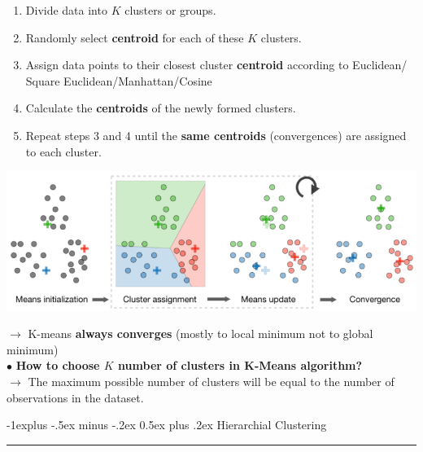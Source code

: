 \documentclass[letterpaper, 10.5pt,landscape]{article}
\makeatletter
\renewcommand{\subsection}{\@startsection{subsection}{2}{0mm}%
                                {-1explus -.5ex minus -.2ex}%
                                {0.5ex plus .2ex}%
                                {\normalfont\normalsize\bfseries}}
\makeatother
\begin{document}
\begin{multicols*}{3}
\begin{enumerate}
    \item Divide data into $K$ clusters or groups.
    \vspace{-3pt}
    \item Randomly select \textbf{centroid} for each of these $K$ clusters.
    \vspace{-3pt}
    \item Assign data points to their closest cluster
    \textbf{centroid} according to Euclidean/ Square Euclidean/Manhattan/Cosine
    \vspace{-3pt}
    \item Calculate the \textbf{centroids} of the newly formed clusters.
    \vspace{-3pt}
    \item Repeat steps 3 and 4 until the \textbf{same centroids} (convergences) are assigned to each cluster.
    \vspace{-3pt}
\end{enumerate}


\begin{center}
    \begin{minipage}{\linewidth}
    \includegraphics[width=\textwidth]{figures/k_means_cluster_update.PNG}
    \end{minipage}
\end{center}

$\rightarrow$ K-means \textbf{always converges} (mostly to local minimum not to global minimum) \\

$\bullet$ \textbf{How to choose $K$ number of clusters in K-Means algorithm?} \\
$\rightarrow$ The maximum possible number of clusters will be equal to the number of observations in the dataset.



\subsection{Hierarchial Clustering} {\color{teal}\hrule height 0.5pt} \smallskip


\end{multicols*}
\end{document}
